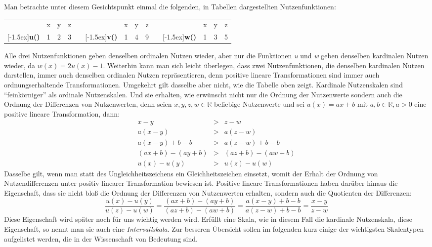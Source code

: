Man betrachte unter diesem Gesichtspunkt einmal die folgenden, in
Tabellen dargestellten Nutzenfunktionen:

\begin{center}
\begin{tabular}{cc|c|cccc|c|cccc|c|c|}
& x  &  y  &  z  &  &  &  x  &  y  &  z & & & x & y & z \\ 
\cline{2-4} \cline{7-9} \cline{12-14}
\raisebox{1.5ex}[-1.5ex]{{\bf u()}} 
&  1  &  2  &  3  &  &  
\raisebox{1.5ex}[-1.5ex]{{\bf v()}}
&  1  &  4  &  9 &  &
\raisebox{1.5ex}[-1.5ex]{{\bf w()}}
&  1  &  3  &  5
\end{tabular}
\end{center}

Alle drei Nutzenfunktionen geben denselben ordinalen Nutzen wieder, aber nur die
Funktionen {\em u} und {\em w} geben denselben kardinalen Nutzen wieder, da $w(x)
= 2u(x)-1$. Weiterhin kann man sich leicht überlegen, dass zwei Nutzenfunktionen,
die denselben kardinalen Nutzen darstellen, immer auch denselben ordinalen Nutzen
repräsentieren, denn positive lineare Transformationen sind immer auch
ordnungserhaltende Transformationen. Umgekehrt gilt dasselbe aber nicht, wie die
Tabelle oben zeigt. Kardinale Nutzenskalen sind "`feinkörniger"' als ordinale
Nutzenskalen.
Und sie erhalten, wie erwünscht nicht nur die Ordnung der Nutzenwerte sondern
auch die Ordnung der Differenzen von Nutzenwerten, denn seien $x,y,z,w \in
\mathbb{R}$ beliebige Nutzenwerte und sei $u(x) = ax + b$ mit $a,b \in
\mathbb{R}, a > 0$ eine positive lineare Transformation, dann:
\begin{eqnarray*}
  x - y & > & z - w  \\
  a(x-y) & > & a(z-w)  \\
  a(x-y) + b - b & > & a(z-w) + b - b \\
  (ax + b) - (ay + b) & > & (az + b) - (aw + b) \\
  u(x) - u(y) & > & u(z) - u(w) 
\end{eqnarray*}
Dasselbe gilt, wenn man statt des Ungleichheitszeichens ein Gleichheitszeichen
einsetzt, womit der Erhalt der Ordnung von Nutzendifferenzen unter positiv
linearer Transformation bewiesen ist. Positive lineare Transformationen haben 
darüber hinaus die Eigenschaft, dass sie nicht bloß die
Ordnung der Differenzen von Nutzenwerten erhalten, sondern auch die Quotienten
der Differenzen:
\[ \frac{u(x) - u(y)}{u(z) - u(w)} = 
   \frac{(ax + b) - (ay + b)}{(az + b) - (aw + b)} = 
   \frac{a(x - y) + b-b}{a(z - w) + b-b} = 
   \frac{x - y}{z - w} \]
Diese Eigenschaft wird später noch für uns wichtig werden wird. Erfüllt eine
Skala, wie in diesem Fall die kardinale Nutzenskala, diese Eigenschaft, so nennt
man sie auch eine {\em Intervallskala}. Zur besseren Übersicht sollen im
folgenden kurz einige der wichtigsten Skalentypen aufgelistet werden, die in
der Wissenschaft von Bedeutung sind.

